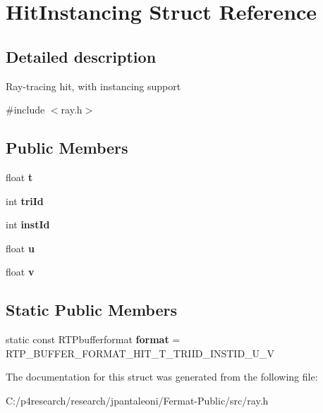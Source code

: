 \hypertarget{struct_hit_instancing}{}\section{Hit\+Instancing Struct Reference}
\label{struct_hit_instancing}


\subsection{Detailed description}
Ray-\/tracing hit, with instancing support 

{\ttfamily \#include $<$ray.\+h$>$}

\subsection*{Public Members}
\begin{DoxyCompactItemize}
\item 
\mbox{\label{struct_hit_instancing_ae028c9b58c866a8bb2cee4027d59b153}} 
float {\bfseries t}
\item 
\mbox{\label{struct_hit_instancing_a51b976b19130968b83f41113b19a662f}} 
int {\bfseries tri\+Id}
\item 
\mbox{\label{struct_hit_instancing_a8fb740a87b3810b3cf457e89f4d13f87}} 
int {\bfseries inst\+Id}
\item 
\mbox{\label{struct_hit_instancing_aaad0cb2c84933a22d70aaa9b7cd23636}} 
float {\bfseries u}
\item 
\mbox{\label{struct_hit_instancing_a6e7e4aece1a690b183157b55fdb2f0d6}} 
float {\bfseries v}
\end{DoxyCompactItemize}
\subsection*{Static Public Members}
\begin{DoxyCompactItemize}
\item 
\mbox{\label{struct_hit_instancing_a88b488d3d1d5086ca43f4e6f33e26674}} 
static const R\+T\+Pbufferformat {\bfseries format} = R\+T\+P\+\_\+\+B\+U\+F\+F\+E\+R\+\_\+\+F\+O\+R\+M\+A\+T\+\_\+\+H\+I\+T\+\_\+\+T\+\_\+\+T\+R\+I\+I\+D\+\_\+\+I\+N\+S\+T\+I\+D\+\_\+\+U\+\_\+V
\end{DoxyCompactItemize}


The documentation for this struct was generated from the following file\+:\begin{DoxyCompactItemize}
\item 
C\+:/p4research/research/jpantaleoni/\+Fermat-\/\+Public/src/ray.\+h\end{DoxyCompactItemize}
